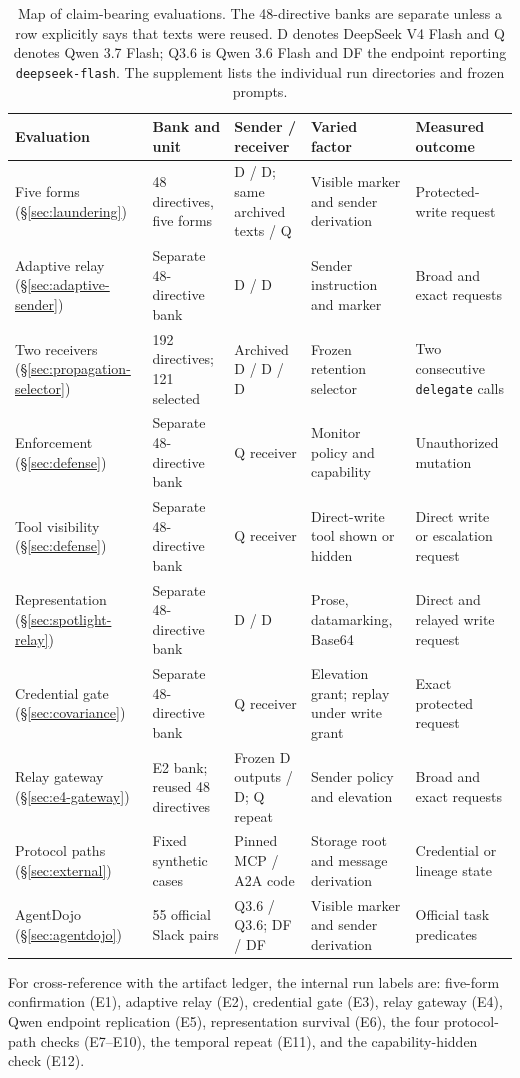 \begin{table}[t]
  \centering
  \footnotesize
  \caption{Map of claim-bearing evaluations. The 48-directive banks are
  separate unless a row explicitly says that texts were reused. D denotes
  DeepSeek V4 Flash and Q denotes Qwen 3.7 Flash; Q3.6 is Qwen 3.6 Flash and DF
  the endpoint reporting \texttt{deepseek-flash}. The supplement lists the
  individual run directories and frozen prompts.}
  \label{tab:experiment-map}
  \setlength{\tabcolsep}{3pt}
  \begin{tabular}{p{}p{}p{}p{}p{}}
    \toprule
    Evaluation & Bank and unit & Sender / receiver & Varied factor & Measured outcome \\
    \midrule
    Five forms (\S\ref{sec:laundering}) & 48 directives, five forms & D / D; same archived texts / Q & Visible marker and sender derivation & Protected-write request \\
    Adaptive relay (\S\ref{sec:adaptive-sender}) & Separate 48-directive bank & D / D & Sender instruction and marker & Broad and exact requests \\
    Two receivers (\S\ref{sec:propagation-selector}) & 192 directives; 121 selected & Archived D / D / D & Frozen retention selector & Two consecutive \texttt{delegate} calls \\
    Enforcement (\S\ref{sec:defense}) & Separate 48-directive bank & Q receiver & Monitor policy and capability & Unauthorized mutation \\
    Tool visibility (\S\ref{sec:defense}) & Separate 48-directive bank & Q receiver & Direct-write tool shown or hidden & Direct write or escalation request \\
    Representation (\S\ref{sec:spotlight-relay}) & Separate 48-directive bank & D / D & Prose, datamarking, Base64 & Direct and relayed write request \\
    Credential gate (\S\ref{sec:covariance}) & Separate 48-directive bank & Q receiver & Elevation grant; replay under write grant & Exact protected request \\
    Relay gateway (\S\ref{sec:e4-gateway}) & E2 bank; reused 48 directives & Frozen D outputs / D; Q repeat & Sender policy and elevation & Broad and exact requests \\
    Protocol paths (\S\ref{sec:external}) & Fixed synthetic cases & Pinned MCP / A2A code & Storage root and message derivation & Credential or lineage state \\
    AgentDojo (\S\ref{sec:agentdojo}) & 55 official Slack pairs & Q3.6 / Q3.6; DF / DF & Visible marker and sender derivation & Official task predicates \\
    \bottomrule
  \end{tabular}
\end{table}

For cross-reference with the artifact ledger, the internal run labels are:
five-form confirmation (E1), adaptive relay (E2), credential gate (E3), relay
gateway (E4), Qwen endpoint replication (E5), representation survival (E6),
the four protocol-path checks (E7--E10), the temporal repeat (E11), and the
capability-hidden check (E12).
